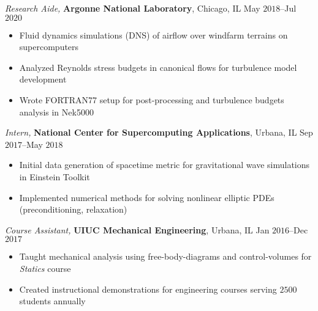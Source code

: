 \documentclass[10pt]{article}
\begin{document}
\begin{multicols}{2}
\vspace{0.5em}
%
\textit{Research Aide,} \textbf{Argonne National Laboratory}, Chicago, IL \hfill May $2018$--Jul $2020$

\vspace{-1.75em}
\begin{itemize}[label=-,leftmargin=1.0em]
    \setlength\itemsep{-0.25em}
    \item Fluid dynamics simulations (DNS) of airflow over windfarm terrains on supercomputers
    \item Analyzed Reynolds stress budgets in canonical flows for turbulence model development
    \item Wrote FORTRAN77 setup for post-processing and turbulence budgets analysis in Nek5000
\end{itemize}
\vspace{-2.0em}

\vspace{0.5em}
%
\textit{Intern,} \textbf{National Center for Supercomputing Applications}, Urbana, IL \hfill Sep $2017$--May $2018$

\vspace{-1.75em}
\begin{itemize}[label=-,leftmargin=1.0em]
    \setlength\itemsep{-0.25em}
    \item Initial data generation of spacetime metric for gravitational wave simulations in Einstein Toolkit
    \item Implemented numerical methods for solving nonlinear elliptic PDEs (preconditioning, relaxation)
\end{itemize}
\vspace{-2.0em}

\vspace{0.5em}
%
{\sl Course Assistant,} \textbf{UIUC Mechanical Engineering}, Urbana, IL \hfill Jan $2016$--Dec $2017$

\vspace{-1.75em}
\begin{itemize}[label=-,leftmargin=1.0em]
    \setlength\itemsep{-0.25em}
    \item Taught mechanical analysis using free-body-diagrams and control-volumes for \textit{Statics} course
    \item Created instructional demonstrations for engineering courses serving $2500$ students annually
\end{itemize}
\vspace{-2.0em}

\end{multicols}
\end{document}
